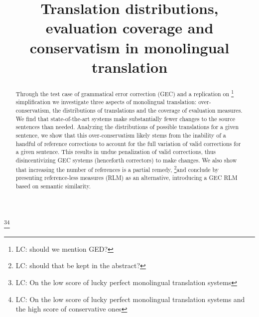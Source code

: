 \documentclass[letterpaper, 11pt]{article}
\newcommand{\lc}[1]{\footnote{\color{blue}LC: #1}}
\begin{document}
\lc{On the low score of lucky perfect monolingual translation systems}\lc{On the low score of lucky perfect monolingual translation systems and the high score of conservative ones}
\title{Translation distributions, evaluation coverage and conservatism in monolingual translation}
\maketitle

\begin{abstract}
  Through the test case of grammatical error correction (GEC) and a replication on \lc{should we mention GED?} simplification we investigate three aspects of monolingual translation: over-conservatism, the distributions of translations and the coverage of evaluation measures. We find that state-of-the-art systems make substantially fewer changes to the source sentences than needed.
  Analyzing the distributions of possible translations for a given sentence, we show that this over-conservatism likely stems from the inability of a handful of reference corrections to account for the full variation of valid corrections for a given sentence. This results in undue penalization of valid corrections, thus disincentivizing GEC systems (henceforth correctors) to make changes.
  We also show that increasing the number of references is a partial remedy, 
  \lc{should that be kept in the abstract?}and conclude by presenting reference-less measures (RLM) as an alternative, introducing a GEC RLM based on semantic similarity.
\end{abstract}
\end{document}
